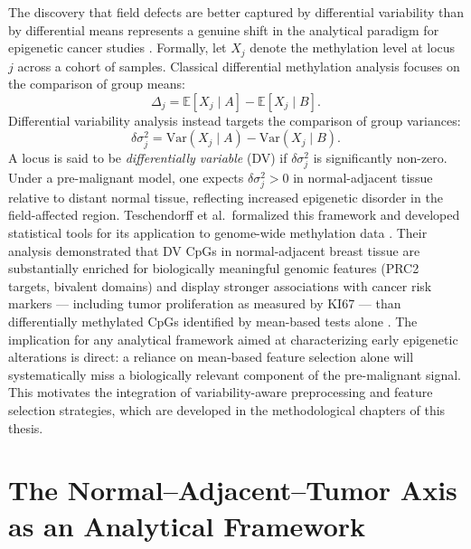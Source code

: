 The discovery that field defects are better captured by differential variability
than by differential means represents a genuine shift in the analytical paradigm
for epigenetic cancer studies \cite{Teschendorff2014}.
Formally, let $X_j$ denote the methylation level at locus $j$ across a cohort
of samples. Classical differential methylation analysis focuses on the comparison
of group means:
\begin{equation}
\Delta_j = \mathbb{E}[X_j \mid A] - \mathbb{E}[X_j \mid B].
\end{equation}
Differential variability analysis instead targets the comparison of group
variances:
\begin{equation}
\delta\sigma^2_j = \text{Var}(X_j \mid A) - \text{Var}(X_j \mid B).
\end{equation}
A locus is said to be \textit{differentially variable} (DV) if $\delta\sigma^2_j$
is significantly non-zero. Under a pre-malignant model, one expects $\delta\sigma^2_j > 0$
in normal-adjacent tissue relative to distant normal tissue, reflecting increased
epigenetic disorder in the field-affected region.
Teschendorff et al.\ formalized this framework and developed statistical tools
for its application to genome-wide methylation data \cite{Teschendorff2014}.
Their analysis demonstrated that DV CpGs in normal-adjacent breast tissue are
substantially enriched for biologically meaningful genomic features (PRC2 targets,
bivalent domains) and display stronger associations with cancer risk markers —
including tumor proliferation as measured by KI67 — than differentially methylated
CpGs identified by mean-based tests alone \cite{Teschendorff2016fielddefects}.
The implication for any analytical framework aimed at characterizing early
epigenetic alterations is direct: a reliance on mean-based feature selection alone
will systematically miss a biologically relevant component of the pre-malignant
signal. This motivates the integration of variability-aware preprocessing and
feature selection strategies, which are developed in the methodological chapters
of this thesis.

\section{The Normal--Adjacent--Tumor Axis as an Analytical Framework}
\label{sec:bio_synthesis}

